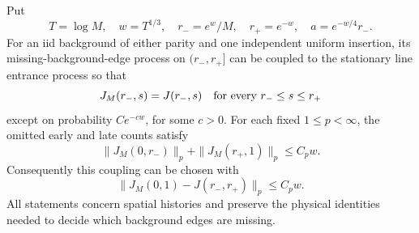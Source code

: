 \documentclass[11pt,letterpaper]{article}
\begin{document}
\begin{lemma}
\label{lem:growing-band-coupling}
Put
\[
 T=\log M,\quad w=T^{1/3},\quad r_-=e^w/M,\quad r_+=e^{-w},
 \quad a=e^{-w/4}r_-.
\]
For an iid background of either parity and one independent uniform
insertion, its missing-background-edge process on $(r_-,r_+]$
can be coupled to the stationary line entrance process so that
\begin{equation}\label{eq:growing-band-coupling}
 J_M(r_-,s)=J(r_-,s)\quad\hbox{for every }r_-\le s\le r_+
\end{equation}
except on probability $Ce^{-cw}$, for some $c>0$.
For each fixed $1\le p<\infty$, the omitted early and late counts satisfy
\begin{equation}\label{eq:history-strip-moments}
 \|J_M(0,r_-)\|_p+\|J_M(r_+,1)\|_p\le C_p w.
\end{equation}
Consequently this coupling can be chosen with
\begin{equation}\label{eq:full-capture-Lp-coupling}
 \|J_M(0,1)-J(r_-,r_+)\|_p\le C_p w.
\end{equation}
All statements concern spatial histories and preserve the physical
identities needed to decide which background edges are missing.
\end{lemma}
\end{document}
